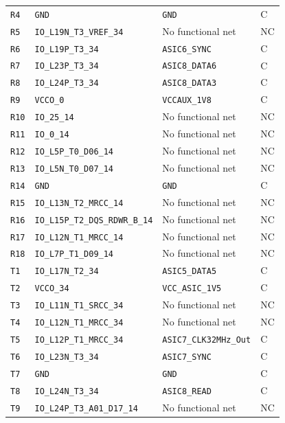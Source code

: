 \documentclass[10pt,a4paper]{article}
\begin{document}
\begin{longtable}{@{}P{15mm}P{42mm}P{92mm}P{10mm}@{}}
\nolinkurl{R4} & \nolinkurl{GND} & \nolinkurl{GND} & C \\
\nolinkurl{R5} & \nolinkurl{IO_L19N_T3_VREF_34} & No functional net & NC \\
\nolinkurl{R6} & \nolinkurl{IO_L19P_T3_34} & \nolinkurl{ASIC6_SYNC} & C \\
\nolinkurl{R7} & \nolinkurl{IO_L23P_T3_34} & \nolinkurl{ASIC8_DATA6} & C \\
\nolinkurl{R8} & \nolinkurl{IO_L24P_T3_34} & \nolinkurl{ASIC8_DATA3} & C \\
\nolinkurl{R9} & \nolinkurl{VCCO_0} & \nolinkurl{VCCAUX_1V8} & C \\
\nolinkurl{R10} & \nolinkurl{IO_25_14} & No functional net & NC \\
\nolinkurl{R11} & \nolinkurl{IO_0_14} & No functional net & NC \\
\nolinkurl{R12} & \nolinkurl{IO_L5P_T0_D06_14} & No functional net & NC \\
\nolinkurl{R13} & \nolinkurl{IO_L5N_T0_D07_14} & No functional net & NC \\
\nolinkurl{R14} & \nolinkurl{GND} & \nolinkurl{GND} & C \\
\nolinkurl{R15} & \nolinkurl{IO_L13N_T2_MRCC_14} & No functional net & NC \\
\nolinkurl{R16} & \nolinkurl{IO_L15P_T2_DQS_RDWR_B_14} & No functional net & NC \\
\nolinkurl{R17} & \nolinkurl{IO_L12N_T1_MRCC_14} & No functional net & NC \\
\nolinkurl{R18} & \nolinkurl{IO_L7P_T1_D09_14} & No functional net & NC \\
\nolinkurl{T1} & \nolinkurl{IO_L17N_T2_34} & \nolinkurl{ASIC5_DATA5} & C \\
\nolinkurl{T2} & \nolinkurl{VCCO_34} & \nolinkurl{VCC_ASIC_1V5} & C \\
\nolinkurl{T3} & \nolinkurl{IO_L11N_T1_SRCC_34} & No functional net & NC \\
\nolinkurl{T4} & \nolinkurl{IO_L12N_T1_MRCC_34} & No functional net & NC \\
\nolinkurl{T5} & \nolinkurl{IO_L12P_T1_MRCC_34} & \nolinkurl{ASIC7_CLK32MHz_Out} & C \\
\nolinkurl{T6} & \nolinkurl{IO_L23N_T3_34} & \nolinkurl{ASIC7_SYNC} & C \\
\nolinkurl{T7} & \nolinkurl{GND} & \nolinkurl{GND} & C \\
\nolinkurl{T8} & \nolinkurl{IO_L24N_T3_34} & \nolinkurl{ASIC8_READ} & C \\
\nolinkurl{T9} & \nolinkurl{IO_L24P_T3_A01_D17_14} & No functional net & NC \\

\end{longtable}
\end{document}
